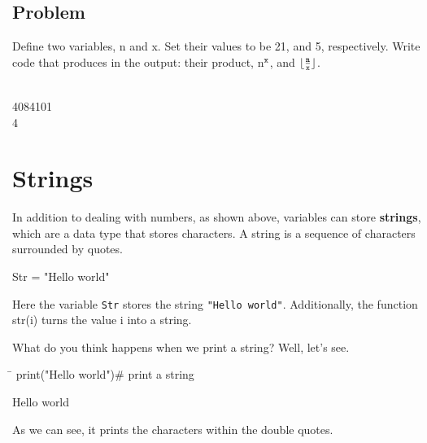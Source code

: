 \documentclass{article}
\newcommand{\define}[1]{\begin{center}\ttfamily #1\end{center}}
\newcommand{\icode}[1]{{\ttfamily #1}}
\begin{document}
\subsection{Problem}
\noindent Define two variables, \icode{n} and \icode{x}. Set their values to be 21, and 5, respectively. Write code that produces in the output: their product, \icode{n}$^\text{\icode{x}}$, and $\lfloor \frac{\text{\icode{n}}}{\text{\icode{x}}} \rfloor$.
\vspace{1 mm}
\begin{tcolorbox}
	\ttfamily
	\vspace{3 cm}
\end{tcolorbox}
\begin{tcolorbox}[colback=output]
	\\
	4084101\\
	4
\end{tcolorbox}

\section{Strings}
In addition to dealing with numbers, as shown above, variables can store \textbf{strings}, which are a data type that stores characters. A string is a sequence of characters surrounded by quotes.
\define{Str = "Hello world"}
Here the variable \texttt{Str} stores the string \texttt{"Hello world"}. Additionally, the function \icode{str(i)} turns the value \icode{i} into a string.

What do you think happens when we print a string? Well, let's see.

\begin{tcolorbox}
	\ttfamily
	\begin{tabbing}
		\hspace{3.25 in}\=\hspace{3.25 in} \kill
		print("Hello world")\>\# print a string
	\end{tabbing}
\end{tcolorbox}
\begin{tcolorbox}[colback=output]
	\ttfamily
	Hello world
\end{tcolorbox}
As we can see, it prints the characters within the double quotes.
\end{document}
